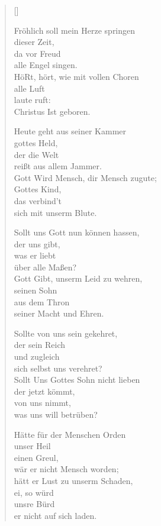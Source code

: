 \begin{multicols}{2}
\settowidth{\versewidth}{Meine Schuld kann mich nicht drücken,}
\begin{verse}[\versewidth]
 
 Fröhlich soll mein Herze springen\\
dieser Zeit,\\
da vor Freud\\
alle Engel singen.\\
HöRt, hört, wie mit vollen Choren\\
alle Luft\\
laute ruft:\\
Christus Ist geboren.
 
 Heute geht aus seiner Kammer\\
gottes Held,\\
der die Welt\\
reißt aus allem Jammer.\\
Gott Wird Mensch, dir Mensch zugute;\\
Gottes Kind,\\
das verbind't\\
sich mit unserm Blute.
 
 Sollt uns Gott nun können hassen,\\
der uns gibt,\\
was er liebt\\
über alle Maßen?\\
Gott Gibt, unserm Leid zu wehren,\\
seinen Sohn\\
aus dem Thron\\
seiner Macht und Ehren.
 
 Sollte von uns sein gekehret,\\
der sein Reich\\
und zugleich\\
sich selbst uns verehret?\\
Sollt Uns Gottes Sohn nicht lieben\\
der jetzt kömmt,\\
von uns nimmt,\\
was uns will betrüben?
 
 Hätte für der Menschen Orden\\
unser Heil\\
einen Greul,\\
wär er nicht Mensch worden;\\
hätt er Lust zu unserm Schaden,\\
ei, so würd\\
unsre Bürd\\
er nicht auf sich laden.
 

\end{verse}
\end{multicols}
